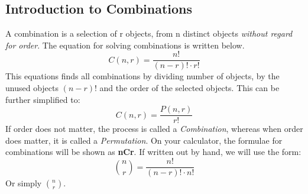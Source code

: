 \documentclass[final,1p,12pt]{elsarticle}
\begin{document}
    \subsection{Introduction to Combinations}
    A combination is a selection of r objects, from n distinct objects \emph{without regard for order}.
    The equation for solving combinations is written below.
    \begin{equation*}
        C(n,r) = \frac{n!}{(n-r)!\cdot r!}
    \end{equation*}
    This equations finds all combinations by dividing number of objects, by the unused objects $(n-r)!$ and the order of the selected objects.
    This can be further simplified to:
    \begin{equation*}
        C(n,r) = \frac{P(n,r)}{r!}
    \end{equation*}
    If order does not matter, the process is called a \emph{Combination}, whereas when order does matter, it is called a \emph{Permutation}.
    On your calculator, the formulae for combinations will be shown as \textbf{nCr}.
    If written out by hand, we will use the form:
    \begin{equation*}
        \binom{n}{r} = \frac{n!}{(n-r)!\cdot n!}
    \end{equation*}
    Or simply \(\binom{n}{r}\).
    
\end{document}

